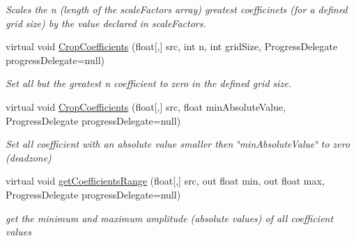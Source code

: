 \begin{DoxyCompactItemize}
\begin{DoxyCompactList}\small\item\em \-Scales the n (length of the scale\-Factors array) greatest coefficinets (for a defined grid size) by the value declared in scale\-Factors. \end{DoxyCompactList}\item 
virtual void \hyperlink{class_turbo_wavelets_1_1_wavelet2_d_aa1e399d2ab5f85843185a2895bf7f7ad}{\-Crop\-Coefficients} (float\mbox{[},\mbox{]} src, int n, int grid\-Size, \-Progress\-Delegate progress\-Delegate=null)
\begin{DoxyCompactList}\small\item\em \-Set all but the greatest n coefficient to zero in the defined grid size. \end{DoxyCompactList}\item 
virtual void \hyperlink{class_turbo_wavelets_1_1_wavelet2_d_a9abbbf0cffd0d8dca5d78d6ad4dad399}{\-Crop\-Coefficients} (float\mbox{[},\mbox{]} src, float min\-Absolute\-Value, \-Progress\-Delegate progress\-Delegate=null)
\begin{DoxyCompactList}\small\item\em \-Set all coefficient with an absolute value smaller then \char`\"{}min\-Absolute\-Value\char`\"{} to zero (deadzone) \end{DoxyCompactList}\item 
virtual void \hyperlink{class_turbo_wavelets_1_1_wavelet2_d_ad25227565f3b5e5953e951ad5b375654}{get\-Coefficients\-Range} (float\mbox{[},\mbox{]} src, out float min, out float max, \-Progress\-Delegate progress\-Delegate=null)
\begin{DoxyCompactList}\small\item\em get the minimum and maximum amplitude (absolute values) of all coefficient values \end{DoxyCompactList}\end{DoxyCompactItemize}
